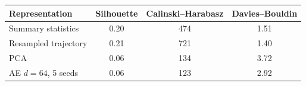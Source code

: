 \begin{tabular}{lccc}\toprule
Representation & Silhouette & Calinski--Harabasz & Davies--Bouldin \\ \midrule
Summary statistics & 0.20 & 474 & 1.51 \\
Resampled trajectory & 0.21 & 721 & 1.40 \\
PCA & 0.06 & 134 & 3.72 \\
AE $d=64$, 5 seeds & 0.06 & 123 & 2.92 \\
\bottomrule\end{tabular}